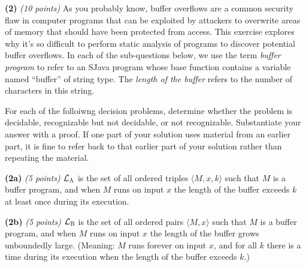 \documentclass[12pt]{article}
\newcommand{\sjava}{{\sc SJava}\xspace}
\newcommand{\lsub}[1]{\mathcal{L}_{\textsc{#1}}}
\def\gap{0.1in}
\def\bigap{0.25in}
\begin{document}
\setlength{\parindent}{0in}
\addtolength{\parskip}{0.1cm}
\setlength{\fboxrule}{.5mm}\setlength{\fboxsep}{1.2mm}
\newlength{\boxlength}\setlength{\boxlength}{\textwidth}
\addtolength{\boxlength}{-4mm}
\begin{center}
\end{center}
\vspace{5mm}
\vskip \bigap
{\bf (2)} {\em (10 points)} As you probably know, buffer overflows
are a common security flaw in computer programs that can be exploited
by attackers to overwrite areas of memory that should have been
protected from access. This exercise explores why it's so difficult
to perform static analysis of programs to discover potential buffer
overflows. In each of the sub-questions below, we use the term
{\em buffer program} to refer to an \sjava program whose base
function contains a variable named ``buffer'' of string type.
The {\em length of the buffer} refers to the number of characters
in this string.

For each of the folloiwng decision problems, determine whether the
problem is decidable, recognizable but not decidable,
or not recognizable. Substantiate your answer with a proof.
If one part of your solution uses material from
an earlier part, it is fine to refer back to that earlier
part of  your solution rather than repeating the material.


\vskip \gap
{\bf (2a)} {\em (5 points)} $\lsub{A}$ is the set of all ordered
triples $\langle M, x, k \rangle$ such that $M$ is a buffer program,
and when $M$ runs on input $x$ the length of the  buffer
exceeds $k$ at least once during its execution.

\vskip \gap
{\bf (2b)} {\em (5 points)} $\lsub{B}$ is the set of all ordered
pairs $\langle M, x \rangle$ such that $M$ is a buffer program,
and when $M$ runs on input $x$ the length of the buffer grows
unboundedly large. (Meaning: $M$ runs forever on input $x$,
and for all $k$ there is a time during its execution when the
length of the buffer exceeds $k$.)


\end{document}

